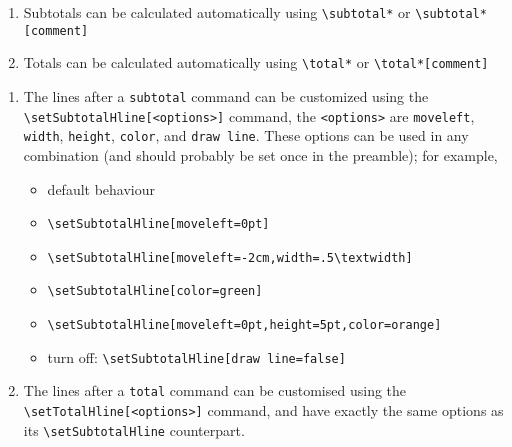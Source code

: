 \documentclass{outn}
\begin{document}
\begin{enumerate}
  \item Subtotals can be calculated automatically using \verb!\subtotal*! 
    or \verb!\subtotal*[comment]!  
  \item Totals can be calculated automatically using  \verb!\total*! 
    or \verb!\total*[comment]! 
\end{enumerate}
\subtotal*

\bigskip
\total*

\begin{enumerate}
  \item The lines after a \verb!subtotal! command can be customized using
    the \verb!\setSubtotalHline[<options>]! command, the \verb!<options>! 
    are \verb!moveleft!, \verb!width!, \verb!height!, \verb!color!, 
    and \verb!draw line!. 
    These options can be used in any combination (and should probably be set once in the preamble); for example, 
    \begin{itemize}
      \item default behaviour

        \subtotal*
      \item \verb!\setSubtotalHline[moveleft=0pt]!
        \setSubtotalHline[moveleft=0pt]

        \subtotal*
      \item \verb!\setSubtotalHline[moveleft=-2cm,width=.5\textwidth]!
        \setSubtotalHline[moveleft=-2cm,width=.5\textwidth]

        \subtotal*
      \item \verb!\setSubtotalHline[color=green]!
        \setSubtotalHline[color=green] 

      \item \verb!\setSubtotalHline[moveleft=0pt,height=5pt,color=orange]!
        \setSubtotalHline[moveleft=0pt,height=5pt,color=orange]

        \subtotal*
      \item turn off: \verb!\setSubtotalHline[draw line=false]! 
            \setSubtotalHline[draw line=false]
        
        \subtotal*
    \end{itemize}
  \item The lines after a \verb!total! command can be customised 
    using the \verb!\setTotalHline[<options>]! command, and have
    exactly the same options as its \verb!\setSubtotalHline! counterpart.


\end{enumerate}
\end{document}

